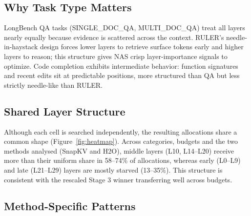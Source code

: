 \documentclass[11pt]{article}
\begin{document}


\subsection{Why Task Type Matters}

LongBench QA tasks (SINGLE\_DOC\_QA, MULTI\_DOC\_QA) treat all layers nearly equally because evidence is scattered across the context. RULER's needle-in-haystack design forces lower layers to retrieve surface tokens early and higher layers to reason; this structure gives NAS crisp layer-importance signals to optimize. Code completion exhibits intermediate behavior: function signatures and recent edits sit at predictable positions, more structured than QA but less strictly needle-like than RULER.

\subsection{Shared Layer Structure}

Although each cell is searched independently, the resulting allocations share a common shape (Figure~\ref{fig:heatmap}). Across categories, budgets and the two methods analysed (SnapKV and H2O), middle layers (L10, L14--L20) receive more than their uniform share in 58--74\% of allocations, whereas early (L0--L9) and late (L21--L29) layers are mostly starved (13--35\%). This structure is consistent with the rescaled Stage 3 winner transferring well across budgets.

\subsection{Method-Specific Patterns}
\end{document}

